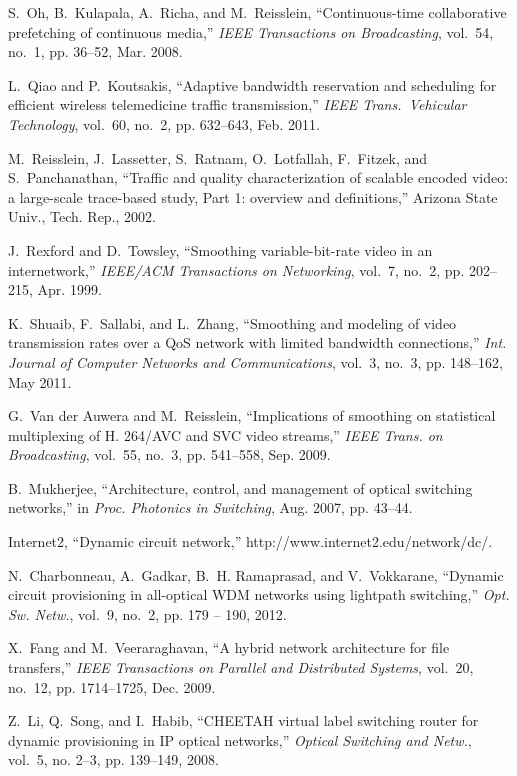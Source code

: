 \documentclass[article]{IEEEtran}
\begin{document}
\begin{thebibliography}{100}
S.~Oh, B.~Kulapala, A.~Richa, and M.~Reisslein, ``Continuous-time collaborative
  prefetching of continuous media,'' \emph{IEEE Transactions on Broadcasting},
  vol.~54, no.~1, pp. 36--52, Mar. 2008.

L.~Qiao and P.~Koutsakis, ``Adaptive bandwidth reservation and scheduling for
  efficient wireless telemedicine traffic transmission,'' \emph{IEEE Trans.\
  Vehicular Technology}, vol.~60, no.~2, pp. 632--643, Feb. 2011.

M.~Reisslein, J.~Lassetter, S.~Ratnam, O.~Lotfallah, F.~Fitzek, and
  S.~Panchanathan, ``Traffic and quality characterization of scalable encoded
  video: a large-scale trace-based study, {Part 1}: overview and definitions,''
  Arizona State Univ., Tech. Rep., 2002.

J.~Rexford and D.~Towsley, ``Smoothing variable-bit-rate video in an
  internetwork,'' \emph{IEEE/ACM Transactions on Networking}, vol.~7, no.~2,
  pp. 202--215, Apr. 1999.

K.~Shuaib, F.~Sallabi, and L.~Zhang, ``Smoothing and modeling of video
  transmission rates over a {QoS} network with limited bandwidth connections,''
  \emph{Int. Journal of Computer Networks and Communications}, vol.~3, no.~3,
  pp. 148--162, May 2011.

G.~{Van der Auwera} and M.~Reisslein, ``Implications of smoothing on
  statistical multiplexing of {H. 264/AVC} and {SVC} video streams,''
  \emph{IEEE Trans. on Broadcasting}, vol.~55, no.~3, pp. 541--558, Sep. 2009.

B.~Mukherjee, ``Architecture, control, and management of optical switching
  networks,'' in \emph{Proc. Photonics in Switching}, Aug. 2007, pp. 43--44.

Internet2, ``Dynamic circuit network,'' http://www.internet2.edu/network/dc/.

N.~Charbonneau, A.~Gadkar, B.~H. Ramaprasad, and V.~Vokkarane, ``Dynamic
  circuit provisioning in all-optical {WDM} networks using lightpath
  switching,'' \emph{Opt. Sw. Netw.}, vol.~9, no.~2, pp. 179 -- 190, 2012.

X.~Fang and M.~Veeraraghavan, ``A hybrid network architecture for file
  transfers,'' \emph{IEEE Transactions on Parallel and Distributed Systems},
  vol.~20, no.~12, pp. 1714--1725, Dec. 2009.

Z.~Li, Q.~Song, and I.~Habib, ``{CHEETAH} virtual label switching router for
  dynamic provisioning in {IP} optical networks,'' \emph{Optical Switching and
  Netw.}, vol.~5, no. 2–3, pp. 139--149, 2008.


\end{thebibliography}
\end{document}
